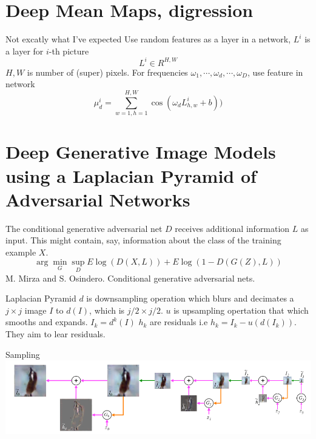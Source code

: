 \documentclass{beamer}
\begin{document}
% 

 



\section{Deep Mean Maps, digression}
\begin{frame}{Not excatly what I've expected}
 Use random features  as a layer in a network, $L^i$ is a layer for $i$-th picture  
 $$
 L^i \in R^{H,W}
 $$
 $H,W$ is number of (super) pixels. For frequencies $\omega_1, \cdots,\omega_d,\cdots,\omega_D$, use feature in network
 $$
 \mu^i_d = \sum_{w=1,h=1}^{H,W} \cos(\omega_d L^i_{h,w}+b) ) 
 $$
\end{frame}



\section{Deep Generative Image Models using a Laplacian Pyramid of Adversarial Networks}

\begin{frame}{The conditional generative adversarial net}
$D$ receives  additional  information $L$ as input. This might contain, say, information about the class of the training example
$X$.
\[
\arg \min_{G} \sup_{D} E \log(D(X,L)) + E \log(1 - D(G(Z),L))
\] 
M. Mirza and S. Osindero. Conditional generative adversarial nets.
\end{frame}


\begin{frame}{Laplacian Pyramid}
$d$ is downsampling operation which blurs and decimates a $j\times j$ image $I$ to $d(I)$, which is $j/2 \times j/2$.
$u$ is upsampling opertation that which smooths and expands.
$I_k = d^k(I)$
$h_k$ are residuals i.e $h_k = I_k - u(d(I_k))$.
They aim to lear residuals.
\end{frame}

\begin{frame}{Sampling}
\includegraphics[width=\textwidth]{./img/sampling.png}
\end{frame}
\end{document}
